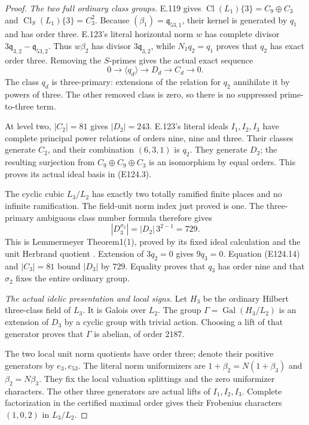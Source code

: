 \begin{proof}
\emph{The two full ordinary class groups.}
E.119 gives $\operatorname{Cl}(L_1)\{3\}=C_9\oplus C_3$
and $\operatorname{Cl}_S(L_1)\{3\}=C_3^2$.
Because $(\beta_1)=\mathfrak q_{53,1}$, their kernel is
generated by $q_1$ and has order three. E.123's literal
horizontal norm $w$ has complete divisor
$3\mathfrak q_{3,2}-\mathfrak q_{53,2}$.
Thus $w\beta_2$ has divisor $3\mathfrak q_{3,2}$, while
$N_1q_2=q_1$ proves that $q_2$ has exact order three.
Removing the $S$-primes gives the actual exact sequence
\[
 0\longrightarrow\langle q_d\rangle\longrightarrow D_d
       \longrightarrow C_d\longrightarrow0.
 \tag{E124.14}
\]
The class $q_d$ is three-primary: extensions of the relation
for $q_2$ annihilate it by powers of three. The other removed
class is zero, so there is no suppressed prime-to-three term.

At level two, $|C_2|=81$ gives $|D_2|=243$.
E.123's literal ideals $I_1,I_2,I_3$ have complete principal
power relations of orders nine, nine and three. Their classes
generate $C_2$, and their combination $(6,3,1)$ is $q_2$.
They generate $D_2$; the resulting surjection from
$C_9\oplus C_9\oplus C_3$ is an isomorphism by equal orders.
This proves its actual ideal basis in (E124.3).

The cyclic cubic $L_3/L_2$ has exactly two totally ramified
finite places and no infinite ramification. The field-unit
norm index just proved is one. The three-primary ambiguous
class number formula therefore gives
\[
 |D_3^{\sigma_2}|=|D_2|\,3^{2-1}=729.
 \tag{E124.15}
\]
This is Lemmermeyer Theorem1(1), proved by its fixed ideal
calculation and the unit Herbrand quotient
\cite{E_LemmermeyerAmbiguous}. Extension of $3q_2=0$ gives
$9q_3=0$. Equation (E124.14) and $|C_3|=81$ bound
$|D_3|$ by $729$. Equality proves that $q_3$ has order nine
and that $\sigma_2$ fixes the entire ordinary group.

\emph{The actual idelic presentation and local signs.}
Let $H_3$ be the ordinary Hilbert three-class field of $L_3$.
It is Galois over $L_2$. The group
$\Gamma=\operatorname{Gal}(H_3/L_2)$ is an extension of
$D_3$ by a cyclic group with trivial action. Choosing a lift
of that generator proves that $\Gamma$ is abelian, of order $2187$.

The two local unit norm quotients have order three; denote their
positive generators by $e_3,e_{53}$. The literal norm
uniformizers are $1+\beta_2=N(1+\beta_3)$ and
$\beta_2=N\beta_3$. They fix the local valuation splittings
and the zero uniformizer characters. The other three generators
are actual lifts of $I_1,I_2,I_3$. Complete factorization in
the certified maximal order gives their Frobenius characters
$(1,0,2)$ in $L_3/L_2$.


\end{proof}
